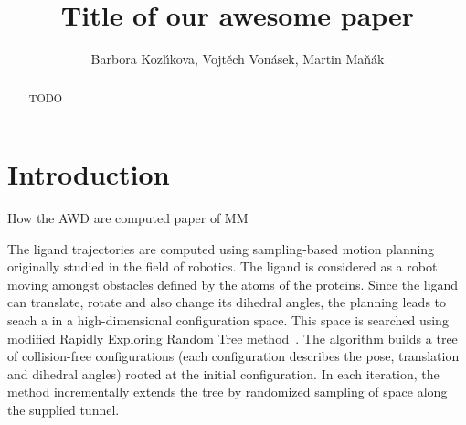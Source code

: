 \documentclass{article}
\title{\LARGE \bf
    Title of our awesome paper
}
\author{
Barbora Kozl\'\i kova, Vojt\v{e}ch Von\'{a}sek, Martin Ma\v{n}\'{a}k
}
\begin{document}
\thispagestyle{empty}
\pagestyle{empty}

\begin{abstract}
TODO
\end{abstract}

\section{Introduction}



How the AWD are computed
paper of MM \cite{manak2017hybrid}


The ligand trajectories are computed using sampling-based motion planning originally studied in the field of robotics.
The ligand is considered as a robot moving amongst obstacles defined by the atoms of the proteins.
Since the ligand can translate, rotate and also change its dihedral angles, the planning leads to seach a in
a high-dimensional configuration space.
This space is searched using modified Rapidly Exploring Random Tree method~\cite{vonasek2017tunnel}.
The algorithm builds a tree of collision-free configurations (each configuration describes the pose, translation and dihedral angles)
rooted at the initial configuration.
In each iteration, the method incrementally extends the tree by randomized sampling of space along the supplied tunnel.





\end{document}

